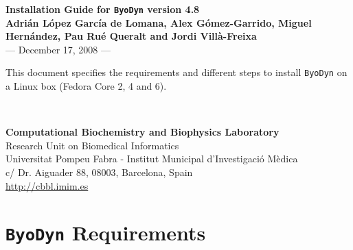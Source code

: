 \documentclass[a4paper, 11pt]{article}
\begin{document}
\begin{center}
  \thispagestyle{empty}
  \textbf{\Large{Installation Guide for \texttt{ByoDyn} version 4.8}}\\[5ex]
  \textbf{Adri\'an L\'opez Garc\'ia de Lomana, Alex G\'omez-Garrido, Miguel Hern\'andez, Pau Ru\'e Queralt and Jordi Vill\`a-Freixa}\\[10ex] --- December 17, 2008 ---\\[10ex]
  \parbox{0.70\linewidth}{
    This document specifies the requirements and different steps to install \texttt{ByoDyn} on a Linux box (Fedora Core 2, 4 and 6). 
  }\\[60ex] 
\end{center}
\begin{footnotesize}
  \begin{raggedleft}
    \textbf{Computational Biochemistry and Biophysics Laboratory}\\
    Research Unit on Biomedical Informatics\\
    Universitat Pompeu Fabra - Institut Municipal d'Investigaci\'o M\`edica\\
    c/ Dr. Aiguader 88, 08003, Barcelona, Spain\\
    \url{http://cbbl.imim.es}\\
  \end{raggedleft}
\end{footnotesize}
\newpage
\tableofcontents
\newpage
\section{\texttt{ByoDyn} Requirements} \label{requirements}
\end{document}
